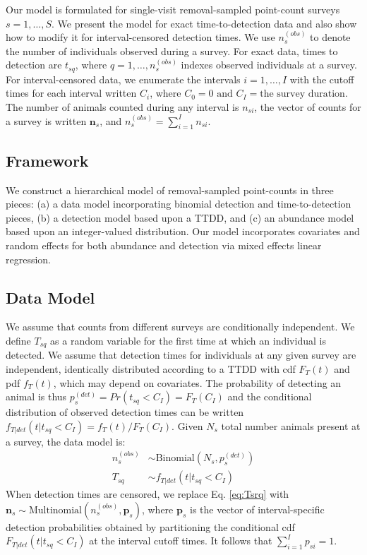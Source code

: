 \documentclass[useAMS,usenatbib,referee,12pt]{article}
\newcommand{\vn}{\textbf{n}}
\begin{document}
Our model is formulated for single-visit removal-sampled point-count surveys $s=1,\dotso,S$.  
We present the model for exact time-to-detection data and also show how to modify it for interval-censored detection times.  
We use $n_{s}^{(obs)}$ to denote the number of individuals observed during a survey.  
For exact data, times to detection are $t_{sq}$, where $q = 1,\dotso,n_{s}^{(obs)}$ indexes observed individuals at a survey.  
For interval-censored data, we enumerate the intervals $i = 1,\dotso,I$ with the cutoff times for each interval written $C_i$, where $C_0 = 0 \text{ and } C_I = \text{the survey duration}$.  
The number of animals counted during any interval is $n_{si}$, the vector of counts for a survey is written $\vn_{s}$, and $n_{s}^{(obs)} = \sum_{i=1}^I n_{si}$.

\subsection{Framework}

We construct a hierarchical model of removal-sampled point-counts in three pieces: (a) a data model incorporating binomial detection and time-to-detection pieces, (b) a detection model based upon a TTDD, and (c) an abundance model based upon an integer-valued distribution.  
Our model incorporates covariates and random effects for both abundance and detection via mixed effects linear regression.

\subsection{Data Model}
We assume that counts from different surveys are conditionally independent.  
We define $T_{sq}$ as a random variable for the first time at which an individual is detected.
We assume that detection times for individuals at any given survey are independent, identically distributed according to a TTDD with cdf $F_T(t)$ and pdf $f_T(t)$, which may depend on covariates.  
The probability of detecting an animal is thus $p_{s}^{(det)} = Pr(t_{sq} < C_I) = F_T(C_I)$ and the conditional distribution of observed detection times can be written $f_{T|det}(t|t_{sq}<C_I) = f_T(t) / F_T(C_I)$.  
Given $N_{s}$ total number animals present at a survey, the data model is:
\begin{align}\label{eq:datamodel}
n_{s}^{(obs)} &\sim \mbox{Binomial}\left(N_{s}, p_{s}^{(det)}\right)\\
\label{eq:Tsrq}T_{sq} &\sim f_{T|det}(t|t_{sq}<C_I)
\end{align}
When detection times are censored, we replace Eq. \ref{eq:Tsrq} with $\vn_{s} \sim \mbox{Multinomial}\left(n_{s}^{(obs)}, \textbf{p}_{s}\right)$, where $\textbf{p}_{s}$ is the vector of interval-specific detection probabilities obtained by partitioning the conditional cdf $F_{T|det}(t|t_{sq}<C_I)$ at the interval cutoff times.  
It follows that $\sum_{i=1}^I p_{si} = 1$.
\end{document}
